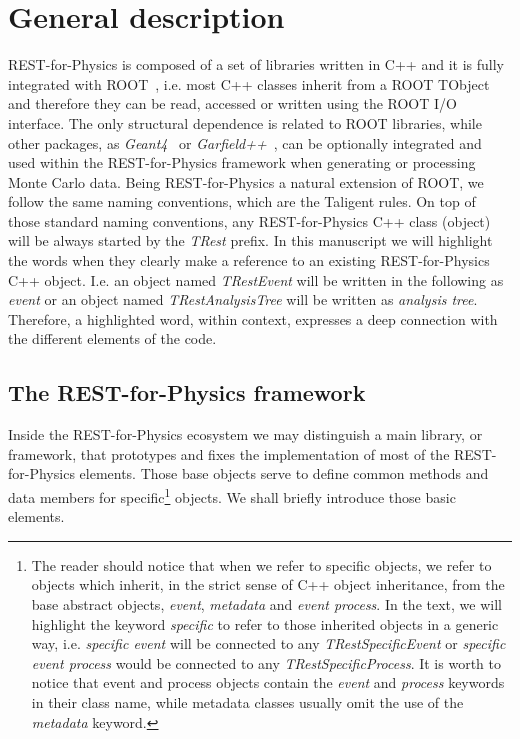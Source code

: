 \section{General description}
\label{sec:framework}



REST-for-Physics is composed of a set of libraries written in C++ and it is fully integrated with ROOT~\cite{ROOT,Brun:2011Gp,ROOT2011}, i.e. most C++ classes inherit from a ROOT TObject and therefore they can be read, accessed or written using the ROOT I/O interface. The only structural dependence is related to ROOT libraries, while other packages, as \emph{Geant4}~\cite{Agostinelli:2002hh} or \emph{Garfield++}~\cite{Garfield}, can be optionally integrated and used within the REST-for-Physics framework when generating or processing Monte Carlo data. Being REST-for-Physics a natural extension of ROOT, we follow the same naming conventions, which are the Taligent rules. On top of those standard naming conventions, any REST-for-Physics C++ class (object) will be always started by the \emph{TRest} prefix. In this manuscript we will highlight the words when they clearly make a reference to an existing REST-for-Physics C++ object. I.e. an object named \emph{TRestEvent} will be written in the following as \emph{event} or an object named \emph{TRestAnalysisTree} will be written as \emph{analysis tree}. Therefore, a highlighted word, within context, expresses a deep connection with the different elements of the code.

\subsection{The REST-for-Physics framework}
Inside the REST-for-Physics ecosystem we may distinguish a main library, or framework, that prototypes and fixes the implementation of most of the REST-for-Physics elements. Those base objects serve to define common methods and data members for specific\footnote{The reader should notice that when we refer to specific objects, we refer to objects which inherit, in the strict sense of C++ object inheritance, from the base abstract objects, \emph{event}, \emph{metadata} and \emph{event process}. In the text, we will highlight the keyword \emph{specific} to refer to those inherited objects in a generic way, i.e. \emph{specific event} will be connected to any \emph{TRestSpecificEvent} or \emph{specific event process} would be connected to any \emph{TRestSpecificProcess}. It is worth to notice that event and process objects contain the \emph{event} and \emph{process} keywords in their class name, while metadata classes usually omit the use of the \emph{metadata} keyword. } objects. We shall briefly introduce those basic elements.


